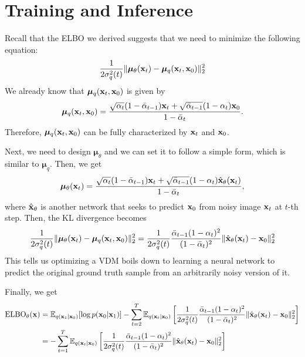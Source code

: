 \section{Training and Inference}
Recall that the ELBO we derived suggests that we need to minimize the following equation:
\begin{align*}
	\frac{1}{2\sigma^2_q(t)}\|\boldsymbol{\mu}_\theta({\mathbf{x}}_t)- \boldsymbol{\mu}_q({\mathbf{x}}_t, {\mathbf{x}}_0)\|^2_2
\end{align*}
We already know that $\boldsymbol{\mu}_q({\mathbf{x}}_t,{\mathbf{x}}_0)$ is given by
\begin{align*}
	\boldsymbol{\mu}_q({\mathbf{x}}_t,{\mathbf{x}}_0) = \frac{\sqrt{{\alpha}_{t}}(1-\bar{\alpha}_{t-1}){\mathbf{x}}_t+\sqrt{\bar{\alpha}_{t-1}}(1-{\alpha}_{t}){\mathbf{x}}_0}{1-\bar{\alpha}_{t}}.
\end{align*}
Therefore, $\boldsymbol{\mu}_q({\mathbf{x}}_t,{\mathbf{x}}_0)$ can be fully characterized by ${\mathbf{x}}_t$ and ${\mathbf{x}}_0$.

Next, we need to design $\boldsymbol{\mu}_\theta$ and we can set it to follow a simple form, which is similar to $\boldsymbol{\mu}_q$. Then, we get
\begin{align*}
	\boldsymbol{\mu}_\theta({\mathbf{x}}_t) = \frac{\sqrt{{\alpha}_{t}}(1-\bar{\alpha}_{t-1}){\mathbf{x}}_t+\sqrt{\bar{\alpha}_{t-1}}(1-{\alpha}_{t})\hat{{\mathbf{x}}}_\theta({\mathbf{x}}_t)}{1-\bar{\alpha}_{t}},
\end{align*}
where $\hat{{\mathbf{x}}}_\theta$ is another network that seeks to predict ${\mathbf{x}}_0$ from noisy image ${\mathbf{x}}_t$ at $t$-th step. Then, the KL divergence becomes
\begin{align*}
	\frac{1}{2\sigma^2_q(t)}\|\boldsymbol{\mu}_\theta({\mathbf{x}}_t)- \boldsymbol{\mu}_q({\mathbf{x}}_t, {\mathbf{x}}_0)\|^2_2 = \frac{1}{2\sigma^2_q(t)}\frac{\bar{\alpha}_{t-1}(1-{\alpha}_{t})^2}{(1-\bar{\alpha}_{t})^2}\|\hat{{\mathbf{x}}}_\theta({\mathbf{x}}_t)-{\mathbf{x}}_0\|^2_2
\end{align*}
This tells us optimizing a VDM boils down to learning a neural network to predict the original ground truth sample from an arbitrarily noisy version of it.


Finally, we get 
\begin{align*}
	\text{ELBO}_\theta({\mathbf{x}}) &= \mathbb{E}_{q({\mathbf{x}}_{1}|{\mathbf{x}}_0)}[\log p({\mathbf{x}}_0|{\mathbf{x}}_{1})] -\sum_{t=2}^{T}\mathbb{E}_{q({\mathbf{x}}_{t}|{\mathbf{x}}_0)}\left[\frac{1}{2\sigma^2_q(t)}\frac{\bar{\alpha}_{t-1}(1-{\alpha}_{t})^2}{(1-\bar{\alpha}_{t})^2}\|\hat{{\mathbf{x}}}_\theta({\mathbf{x}}_t)-{\mathbf{x}}_0\|^2_2\right]\\
							 &= -\sum_{t=1}^{T}\mathbb{E}_{q({\mathbf{x}}_{t}|{\mathbf{x}}_0)}\left[\frac{1}{2\sigma^2_q(t)}\frac{\bar{\alpha}_{t-1}(1-{\alpha}_{t})^2}{(1-\bar{\alpha}_{t})^2}\|\hat{{\mathbf{x}}}_\theta({\mathbf{x}}_t)-{\mathbf{x}}_0\|^2_2\right]\\
\end{align*}

